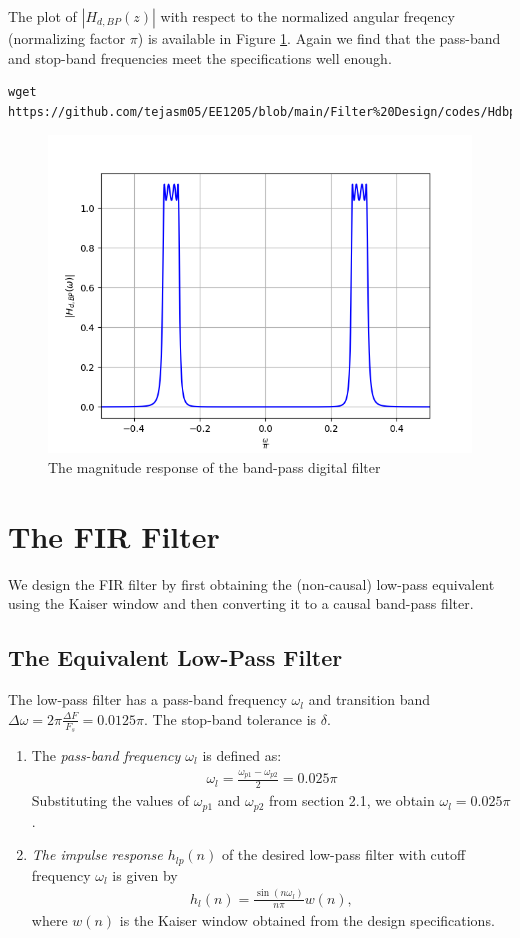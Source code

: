 \documentclass{article}
\begin{document}
The plot of $|H_{d,BP}(z)|$ with respect to the normalized angular freqency (normalizing factor $\pi$) is available in Figure \ref{fig:5}.  Again we
find that the pass-band and stop-band frequencies meet the specifications well enough.
\begin{lstlisting}[caption = {Code for Figure 5}]
wget https://github.com/tejasm05/EE1205/blob/main/Filter%20Design/codes/Hdbp.py
\end{lstlisting}
\begin{figure}[!h]
    \centering
    \includegraphics[width = 0.9\columnwidth]{figs/H_dbp.png}
    \caption{The magnitude response of the band-pass digital filter}
    \label{fig:5}
\end{figure}

\section{The FIR Filter}
We design the FIR filter by first obtaining the (non-causal) low-pass equivalent using the Kaiser window
and then
converting it to a causal band-pass filter.

\subsection{The Equivalent Low-Pass Filter}
The low-pass filter has a pass-band frequency $\omega_l$ and transition band $\Delta \omega = 2\pi \frac{\Delta F}{F_s} = 0.0125\pi$.
The stop-band tolerance is $\delta$.
\begin{enumerate}
\item  The {\em pass-band frequency $\omega_l$}  is defined as:
\begin{align}
    \omega_l = \frac{\omega_{p1} - \omega_{p2}}{2} = 0.025\pi
\end{align}
Substituting the values of $\omega_{p1}$ and $\omega_{p2}$ from section 2.1, we obtain $\omega_l = 0.025\pi$.

\item {\em The impulse response $h_{lp}(n)$} of the desired low-pass filter with cutoff frequency $\omega_l$
is given by
\begin{eqnarray}
\label{firlpdef}
h_l(n) = \frac{\sin(n\omega_l)}{n\pi}w(n),
\end{eqnarray}
where $w(n)$ is the Kaiser window obtained from the design specifications.
\end{enumerate}
\end{document}
